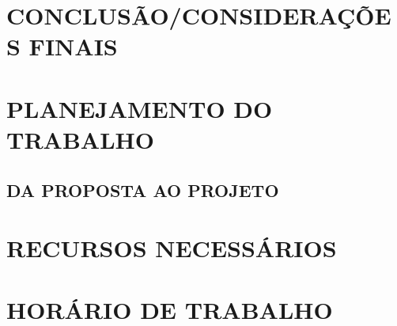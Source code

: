 \section{CONCLUSÃO/CONSIDERAÇÕES FINAIS} %
\label{sec:conclusao}

\section{PLANEJAMENTO DO TRABALHO}
\label{sec:planejamento}


\subsection{DA PROPOSTA AO PROJETO}

\section{RECURSOS NECESSÁRIOS}
\label{sec:recursos}

\section{HORÁRIO DE TRABALHO}
\label{sec:horário}

